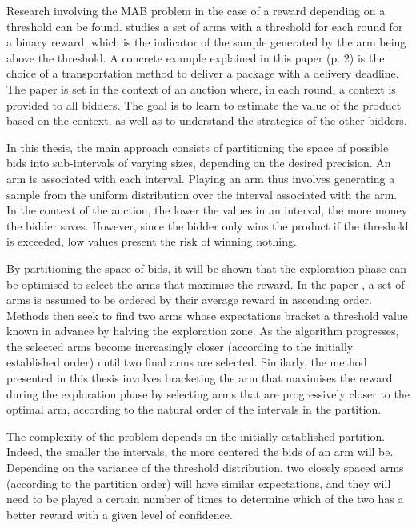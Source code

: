 \documentclass{statsmsc}
\begin{document}
Research involving the MAB problem in the case of a reward depending on a threshold can be found. \cite{NIPS2016_0bf727e9}  studies a set of arms with a threshold for each round for a binary reward, which is the indicator of the sample generated by the arm being above the threshold. A concrete example explained in this paper (p. 2) is the choice of a transportation method to deliver a package with a delivery deadline.
The paper \cite{badanidiyuru2021learningbidcontextualprice} is set in the context of an auction where, in each round, a context is provided to all bidders. The goal is to learn to estimate the value of the product based on the context, as well as to understand the strategies of the other bidders.

In this thesis, the main approach consists of partitioning the space of possible bids into sub-intervals of varying sizes, depending on the desired precision. An arm is associated with each interval. Playing an arm thus involves generating a sample from the uniform distribution over the interval associated with the arm.
In the context of the auction, the lower the values in an interval, the more money the bidder saves. However, since the bidder only wins the product if the threshold is exceeded, low values present the risk of winning nothing.


By partitioning the space of bids, it will be shown that the exploration phase can be optimised to select the arms that maximise the reward. 
In the paper \cite{pmlr-v139-cheshire21a}, a set of arms is assumed to be ordered by their average reward in ascending order. Methods then seek to find two arms whose expectations bracket a threshold value known in advance by halving the exploration zone. As the algorithm progresses, the selected arms become increasingly closer (according to the initially established order) until two final arms are selected. Similarly, the method 
presented in this thesis involves bracketing the arm that maximises the reward during the exploration phase by selecting arms that are progressively closer to the optimal arm, according to the natural order of the intervals in the partition.

The complexity of the problem depends on the initially established partition. Indeed, the smaller the intervals, the more centered the bids of an arm will be. Depending on the variance of the threshold distribution, two closely spaced arms (according to the partition order) will have similar expectations, and they will need to be played a certain number of times to determine which of the two has a better reward with a given level of confidence.
\end{document}
